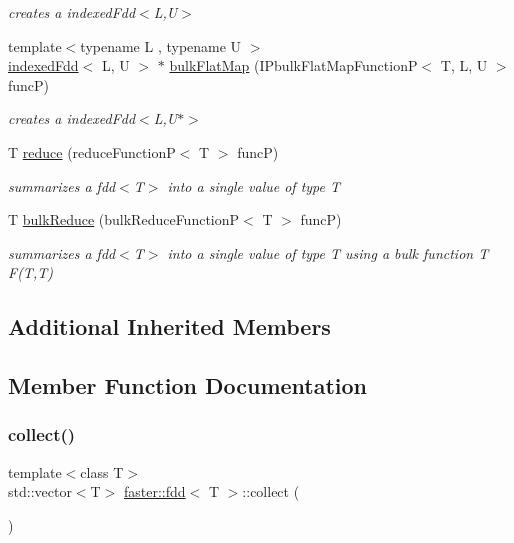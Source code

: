 \begin{DoxyCompactItemize}
\begin{DoxyCompactList}\small\item\em creates a indexed\+Fdd$<$\+L,\+U$>$ \end{DoxyCompactList}\item 
{\footnotesize template$<$typename L , typename U $>$ }\\\hyperlink{classfaster_1_1indexedFdd}{indexed\+Fdd}$<$ L, U $>$ $\ast$ \hyperlink{group__bulk_gaf16d4811371f6dbcfbb717a73a182d48}{bulk\+Flat\+Map} (I\+Pbulk\+Flat\+Map\+FunctionP$<$ T, L, U $>$ funcP)
\begin{DoxyCompactList}\small\item\em creates a indexed\+Fdd$<$\+L,\+U$\ast$$>$ \end{DoxyCompactList}\item 
T \hyperlink{group__reduce_ga1e828ad9a768db382aef2adf878aa1b2}{reduce} (reduce\+FunctionP$<$ T $>$ funcP)
\begin{DoxyCompactList}\small\item\em summarizes a fdd$<$\+T$>$ into a single value of type T \end{DoxyCompactList}\item 
T \hyperlink{group__bulk_ga8f133f23bd653329f44290ebda70bb9b}{bulk\+Reduce} (bulk\+Reduce\+FunctionP$<$ T $>$ funcP)
\begin{DoxyCompactList}\small\item\em summarizes a fdd$<$\+T$>$ into a single value of type T using a bulk function {\itshape T F(\+T,\+T)} \end{DoxyCompactList}\end{DoxyCompactItemize}
\subsection*{Additional Inherited Members}


\subsection{Member Function Documentation}
\hypertarget{classfaster_1_1fdd_a089aa4c91205948dacbc6e6bd6e5bcde}{}\label{classfaster_1_1fdd_a089aa4c91205948dacbc6e6bd6e5bcde} 
\subsubsection{\texorpdfstring{collect()}{collect()}}
{\footnotesize\ttfamily template$<$class T$>$ \\
std\+::vector$<$T$>$ \hyperlink{classfaster_1_1fdd}{faster\+::fdd}$<$ T $>$\+::collect (\begin{DoxyParamCaption}{ }\end{DoxyParamCaption})\hspace{0.3cm}{\ttfamily [inline]}}



